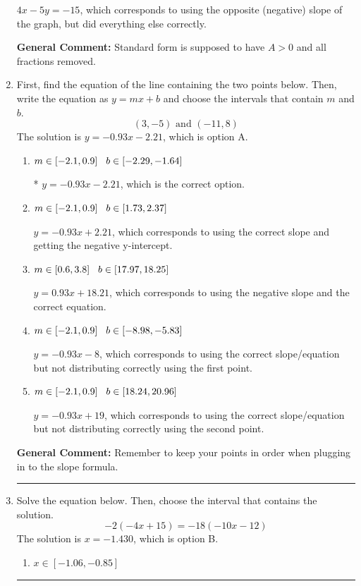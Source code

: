 \documentclass{extbook}[14pt]
\newcommand{\litem}[1]{\item #1

\rule{\textwidth}{0.4pt}}
\begin{document}
\begin{enumerate}
{\begin{enumerate}[label=\Alph*.]
 $4x - 5y = -15$, which corresponds to using the opposite (negative) slope of the graph, but did everything else correctly.
\end{enumerate}

\textbf{General Comment:} Standard form is supposed to have $A > 0$ and all fractions removed.
}
\litem{
First, find the equation of the line containing the two points below. Then, write the equation as $ y=mx+b $ and choose the intervals that contain $m$ and $b$.
\[ (3, -5) \text{ and } (-11, 8) \]The solution is \( y = -0.93x -2.21 \), which is option A.\begin{enumerate}[label=\Alph*.]
\item \( m \in [-2.1, 0.9] \hspace*{3mm} b \in [-2.29, -1.64] \)

* $y = -0.93x -2.21$, which is the correct option.
\item \( m \in [-2.1, 0.9] \hspace*{3mm} b \in [1.73, 2.37] \)

 $y = -0.93x + 2.21$, which corresponds to using the correct slope and getting the negative y-intercept.
\item \( m \in [0.6, 3.8] \hspace*{3mm} b \in [17.97, 18.25] \)

 $y = 0.93x + 18.21$, which corresponds to using the negative slope and the correct equation.
\item \( m \in [-2.1, 0.9] \hspace*{3mm} b \in [-8.98, -5.83] \)

 $y = -0.93x -8$, which corresponds to using the correct slope/equation but not distributing correctly using the first point.
\item \( m \in [-2.1, 0.9] \hspace*{3mm} b \in [18.24, 20.96] \)

 $y = -0.93x + 19$, which corresponds to using the correct slope/equation but not distributing correctly using the second point.
\end{enumerate}

\textbf{General Comment:} Remember to keep your points in order when plugging in to the slope formula.
}
\litem{
Solve the equation below. Then, choose the interval that contains the solution.
\[ -2(-4x + 15) = -18(-10x -12) \]The solution is \( x = -1.430 \), which is option B.\begin{enumerate}[label=\Alph*.]
\item \( x \in [-1.06, -0.85] \)


\end{enumerate}}
\end{enumerate}
\end{document}
